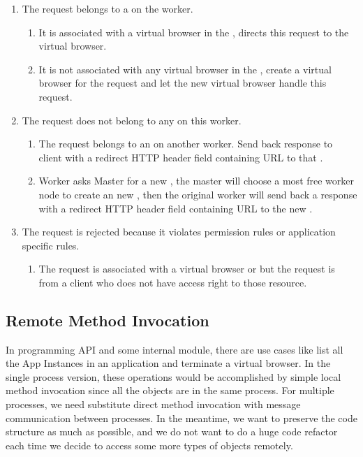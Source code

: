 \begin{enumerate}
    \item The request belongs to a \appins{} on the worker.
    \begin{enumerate}
        \item It is associated with a virtual browser in the \appins{}, directs this request to the virtual browser.
        \item It is not associated with any virtual browser in the \appins{}, create a virtual browser for the request
        and let the new virtual browser handle this request.
    \end{enumerate}

    \item The request does not belong to any \appins{} on this worker.
    \begin{enumerate}
        \item The request belongs to an \appins{} on another worker.
        Send back response to client with a redirect HTTP header field
        containing URL to that \appins{}.
        \item Worker asks Master for a new \appins{},
        the master will choose a most free worker node to create an new \appins{},
        then the original worker will send back a response with a redirect HTTP header field
        containing URL to the new \appins{}.
    \end{enumerate}

    \item The request is rejected because it violates permission rules or application specific rules.
    \begin{enumerate}
        \item The request is associated with a virtual browser or \appins{} but
        the request is from a client who does not have access right to those resource.
    \end{enumerate}
\end{enumerate}



\subsection{Remote Method Invocation}
In \cb{} programming API and some internal module, there are use cases like list all the App Instances in an application
and terminate a virtual browser.
In the single process version, these operations would be accomplished by simple local method invocation
since all the objects are in the same process.
For multiple processes,
we need substitute direct method invocation with message communication between processes.
In the meantime, we want to preserve the code structure as much as possible,
and we do not want to do a huge code refactor each time we decide to access some more types of objects remotely.



